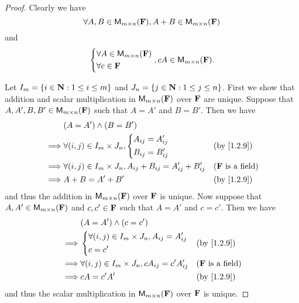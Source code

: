 \begin{proof}
    Clearly we have
    \[
        \forall A, B \in {\mathsf{M}_{{m} \times n}({\mathbf{F}})}, A + B \in {\mathsf{M}_{{m} \times n}({\mathbf{F}})}
    \]
    and
    \[
        \begin{dcases}
            \forall A \in {\mathsf{M}_{{m} \times n}({\mathbf{F}})} \\
            \forall c \in \mathbf{F}
        \end{dcases}, cA \in {\mathsf{M}_{{m} \times n}({\mathbf{F}})}.
    \]

    Let \(I_{m} = \left\lbrace i \in \mathbf{N} : 1 \leq i \leq m\right\rbrace\) and \(J_{n} = \left\lbrace j \in \mathbf{N} : 1 \leq j \leq n\right\rbrace\).
    First we show that addition and scalar multiplication in \({\mathsf{M}_{{m} \times n}({\mathbf{F}})}\) over \(\mathbf{F}\) are unique.
    Suppose that \(A, A', B, B' \in {\mathsf{M}_{{m} \times n}({\mathbf{F}})}\) such that \(A = A'\) and \(B = B'\).
    Then we have
    \begin{align*}
                 & \p{A = A'} \land \p{B = B'}                                                                                      \\
        \implies & \forall \p{i, j} \in I_{m} \times J_{n}, \begin{dcases}
            A_{i j} = A_{i j}' \\
            B_{i j} = B_{i j}'
        \end{dcases}              &  & \text{(by \cref{1.2.9})}   \\
        \implies & \forall \p{i, j} \in I_{m} \times J_{n}, A_{i j} + B_{i j} = A_{i j}' + B_{i j}' &  & \text{(\(\F\) is a field)} \\
        \implies & A + B = A' + B'                                                                  &  & \text{(by \cref{1.2.9})}
    \end{align*}
    and thus the addition in \({\mathsf{M}_{{m} \times n}({\mathbf{F}})}\) over \(\mathbf{F}\) is unique.
    Now suppose that \(A, A' \in {\mathsf{M}_{{m} \times n}({\mathbf{F}})}\) and \(c, c' \in \mathbf{F}\) such that \(A = A'\) and \(c = c'\).
    Then we have
    \begin{align*}
                 & \p{A = A'} \land \p{c = c'}                                                                      \\
        \implies & \begin{dcases}
            \forall \p{i, j} \in I_{m} \times J_{n}, A_{i j} = A_{i j}' \\
            c = c'
        \end{dcases}                                       &  & \text{(by \cref{1.2.9})}   \\
        \implies & \forall \p{i, j} \in I_{m} \times J_{n}, c A_{i j} = c' A_{i j}' &  & \text{(\(\F\) is a field)} \\
        \implies & cA = c' A'                                                       &  & \text{(by \cref{1.2.9})}
    \end{align*}
    and thus the scalar multiplication in \({\mathsf{M}_{{m} \times n}({\mathbf{F}})}\) over \(\mathbf{F}\) is unique.


\end{proof}
